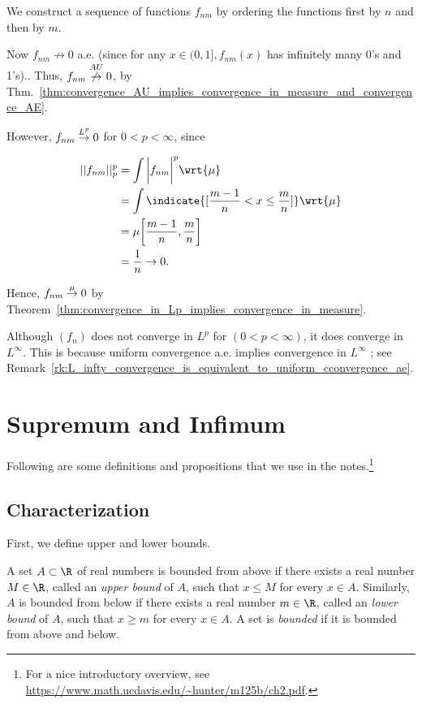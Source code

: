 \documentclass{article} %
\begin{document}
We construct a sequence of  functions $f_{nm}$ by ordering the functions first by $n$ and then by $m$.

Now $f_{nm} \not\to 0$ a.e. {\tiny (since for any $x \in (0,1], f_{nm}(x)$ has infinitely many 0's and 1's).}. Thus, $f_{nm} \stackrel{AU}{\not\to} 0$, by Thm.~\ref{thm:convergence_AU_implies_convergence_in_measure_and_convergence_AE}.
 
 However, $f_{nm}\stackrel{L^p}{\to} 0$ for $0<p<\infty$, since
  
 \begin{align*}
 ||f_{nm}||_p^p &= \int \bigg| f_{nm} \bigg|^p \wrt{\mu} \\
 &= \int \indicate{[\frac{m-1}{n} < x \leq \frac{m}{n}]}  \wrt{\mu} \\
 &= \mu \bigg[\frac{m-1}{n}, \frac{m}{n}\bigg] \\
 &= \frac{1}{n} \to 0. 
 \end{align*}

Hence, $f_{nm} \stackrel{\mu}{\to} 0$ by Theorem~\ref{thm:convergence_in_Lp_implies_convergence_in_measure}. 


\begin{remark}
Although $(f_n)$ does not converge in $L^p$ for $(0<p<\infty)$, it does converge in $L^\infty$. This is because uniform convergence a.e. implies convergence in $L^\infty$ ; see Remark~\ref{rk:L_infty_convergence_is_equivalent_to_uniform_cconvergence_ae}.
\end{remark}




 
\newpage 
\appendix

\section{Supremum and Infimum}

Following are some definitions and propositions that we use in the notes.\footnote{For a nice introductory overview, see \url{https://www.math.ucdavis.edu/~hunter/m125b/ch2.pdf}.}

\subsection{Characterization}

First, we define upper and lower bounds.
\begin{definition}
A set $A \subset \R$ of real numbers is bounded from above if there exists a real number $M \in \R$, called an \textit{upper bound} of $A$, such that $x \leq M$ for every $x \in A$.  Similarly, $A$  is bounded from below if there exists a real number $m \in \R$, called an \textit{lower bound} of $A$, such that $x \geq m$ for every $x \in A$.  A set is \textit{bounded} if it is bounded from above and below.
\label{def:upper_and_lower_bound}	
\end{definition}
\end{document}
